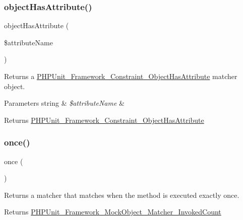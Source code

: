 \subsubsection{\texorpdfstring{object\+Has\+Attribute()}{objectHasAttribute()}}
{\footnotesize\ttfamily object\+Has\+Attribute (\begin{DoxyParamCaption}\item[{}]{\$attribute\+Name }\end{DoxyParamCaption})}

Returns a \mbox{\hyperlink{class_p_h_p_unit___framework___constraint___object_has_attribute}{P\+H\+P\+Unit\+\_\+\+Framework\+\_\+\+Constraint\+\_\+\+Object\+Has\+Attribute}} matcher object.


\begin{DoxyParams}[1]{Parameters}
string & {\em \$attribute\+Name} & \\
\hline
\end{DoxyParams}
\begin{DoxyReturn}{Returns}
\mbox{\hyperlink{class_p_h_p_unit___framework___constraint___object_has_attribute}{P\+H\+P\+Unit\+\_\+\+Framework\+\_\+\+Constraint\+\_\+\+Object\+Has\+Attribute}} 
\end{DoxyReturn}
\mbox{\label{_functions_8php_adf61c548bd057a260bb851f898749157}} 
\subsubsection{\texorpdfstring{once()}{once()}}
{\footnotesize\ttfamily once (\begin{DoxyParamCaption}{ }\end{DoxyParamCaption})}

Returns a matcher that matches when the method is executed exactly once.

\begin{DoxyReturn}{Returns}
\mbox{\hyperlink{class_p_h_p_unit___framework___mock_object___matcher___invoked_count}{P\+H\+P\+Unit\+\_\+\+Framework\+\_\+\+Mock\+Object\+\_\+\+Matcher\+\_\+\+Invoked\+Count}} 
\end{DoxyReturn}
\mbox{\label{_functions_8php_a9d664791c3ed0e1be32a2fc06fb8f349}} 
